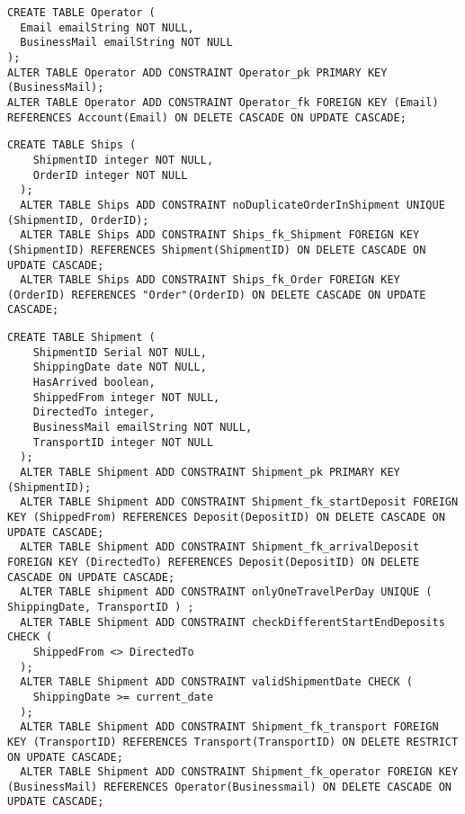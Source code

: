 \begin{lstlisting}[caption={Creazione della tabella \textbf{Operator}}]
  CREATE TABLE Operator (
  Email emailString NOT NULL,
  BusinessMail emailString NOT NULL
);
ALTER TABLE Operator ADD CONSTRAINT Operator_pk PRIMARY KEY (BusinessMail);
ALTER TABLE Operator ADD CONSTRAINT Operator_fk FOREIGN KEY (Email) REFERENCES Account(Email) ON DELETE CASCADE ON UPDATE CASCADE;
\end{lstlisting}


\begin{lstlisting}[caption={Creazione della tabella \textbf{Ships}}]
  CREATE TABLE Ships ( 
    ShipmentID integer NOT NULL,
    OrderID integer NOT NULL
  );
  ALTER TABLE Ships ADD CONSTRAINT noDuplicateOrderInShipment UNIQUE (ShipmentID, OrderID);
  ALTER TABLE Ships ADD CONSTRAINT Ships_fk_Shipment FOREIGN KEY (ShipmentID) REFERENCES Shipment(ShipmentID) ON DELETE CASCADE ON UPDATE CASCADE;
  ALTER TABLE Ships ADD CONSTRAINT Ships_fk_Order FOREIGN KEY (OrderID) REFERENCES "Order"(OrderID) ON DELETE CASCADE ON UPDATE CASCADE;
\end{lstlisting}

\newpage
\begin{lstlisting}[caption={Creazione della tabella \textbf{Shipment}}]
  CREATE TABLE Shipment (
    ShipmentID Serial NOT NULL,
    ShippingDate date NOT NULL,
    HasArrived boolean,
    ShippedFrom integer NOT NULL,
    DirectedTo integer,
    BusinessMail emailString NOT NULL,
    TransportID integer NOT NULL
  );
  ALTER TABLE Shipment ADD CONSTRAINT Shipment_pk PRIMARY KEY (ShipmentID);
  ALTER TABLE Shipment ADD CONSTRAINT Shipment_fk_startDeposit FOREIGN KEY (ShippedFrom) REFERENCES Deposit(DepositID) ON DELETE CASCADE ON UPDATE CASCADE;
  ALTER TABLE Shipment ADD CONSTRAINT Shipment_fk_arrivalDeposit FOREIGN KEY (DirectedTo) REFERENCES Deposit(DepositID) ON DELETE CASCADE ON UPDATE CASCADE;
  ALTER TABLE shipment ADD CONSTRAINT onlyOneTravelPerDay UNIQUE ( ShippingDate, TransportID ) ;
  ALTER TABLE Shipment ADD CONSTRAINT checkDifferentStartEndDeposits CHECK (
    ShippedFrom <> DirectedTo
  );
  ALTER TABLE Shipment ADD CONSTRAINT validShipmentDate CHECK (
    ShippingDate >= current_date
  );
  ALTER TABLE Shipment ADD CONSTRAINT Shipment_fk_transport FOREIGN KEY (TransportID) REFERENCES Transport(TransportID) ON DELETE RESTRICT ON UPDATE CASCADE;
  ALTER TABLE Shipment ADD CONSTRAINT Shipment_fk_operator FOREIGN KEY (BusinessMail) REFERENCES Operator(Businessmail) ON DELETE CASCADE ON UPDATE CASCADE;
\end{lstlisting} %

